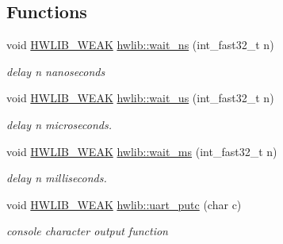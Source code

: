 \subsection*{Functions}
\begin{DoxyCompactItemize}
\item 
void \hyperlink{hwlib-defines_8hpp_a04be4340016df60d6636c1d1c6d94fc9}{H\+W\+L\+I\+B\+\_\+\+W\+E\+AK} \hyperlink{namespacehwlib_a9c01a1d0319f5eadd8926e66aea19aa0}{hwlib\+::wait\+\_\+ns} (int\+\_\+fast32\+\_\+t n)
\begin{DoxyCompactList}\small\item\em delay n nanoseconds \end{DoxyCompactList}\item 
void \hyperlink{hwlib-defines_8hpp_a04be4340016df60d6636c1d1c6d94fc9}{H\+W\+L\+I\+B\+\_\+\+W\+E\+AK} \hyperlink{namespacehwlib_a0096b739fc566c896366ecbd3113cc1e}{hwlib\+::wait\+\_\+us} (int\+\_\+fast32\+\_\+t n)
\begin{DoxyCompactList}\small\item\em delay n microseconds. \end{DoxyCompactList}\item 
void \hyperlink{hwlib-defines_8hpp_a04be4340016df60d6636c1d1c6d94fc9}{H\+W\+L\+I\+B\+\_\+\+W\+E\+AK} \hyperlink{namespacehwlib_a6119aa5d3034176aa1515ef4bb193044}{hwlib\+::wait\+\_\+ms} (int\+\_\+fast32\+\_\+t n)
\begin{DoxyCompactList}\small\item\em delay n milliseconds. \end{DoxyCompactList}\item 
void \hyperlink{hwlib-defines_8hpp_a04be4340016df60d6636c1d1c6d94fc9}{H\+W\+L\+I\+B\+\_\+\+W\+E\+AK} \hyperlink{namespacehwlib_ae568ebef4b8d8a77cecae8cea595896f}{hwlib\+::uart\+\_\+putc} (char c)
\begin{DoxyCompactList}\small\item\em console character output function \end{DoxyCompactList}\end{DoxyCompactItemize}
